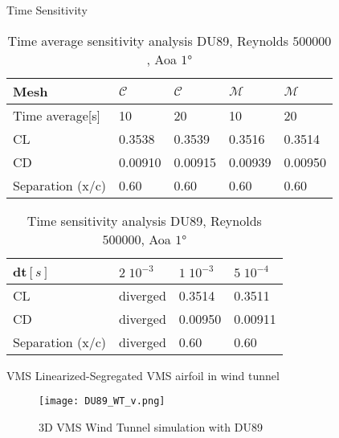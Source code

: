 \begin{frame}{Time Sensitivity}
     \begin{table}[!ht]
          \centering
          
              \begin{tabular}{l|llll}
                  \hline
                  Mesh & $\mathcal{C}$ & $\mathcal{C}$  & $\mathcal{M}$ & $\mathcal{M}$ \\  
                  \hline
                  Time average[s] & 10  & 20 & 10 & 20 \\  
                  CL&0.3538 & 0.3539 & 0.3516 & 0.3514	 \\
                  CD& 0.00910 &0.00915 & 0.00939& 0.00950  \\ 
                  Separation (x/c) & 0.60 & 0.60 & 0.60 & 0.60 \\ 
              \end{tabular}
              
          \caption{Time average sensitivity analysis DU89, Reynolds $\num{500000}$, Aoa $\ang{1}$}
          \label{tab:time-sensitivity-re500000}
     \end{table}

     \begin{table}[!ht]
          \centering
              \begin{tabular}{l|lll}
                  \hline
                  dt$[s]$ & $2\;10^{-3}$  & $1\;10^{-3}$ & $5\;10^{-4}$ \\  \hline
                  CL & diverged & 0.3514  & 0.3511 \\
                  CD & diverged & 0.00950 & 0.00911  \\ 
                  Separation (x/c) & diverged & 0.60 & 0.60 \\ 
              \end{tabular}
              
          \caption{Time sensitivity analysis DU89, Reynolds $\num{500000}$, Aoa $\ang{1}$}
          \label{tab:time-sensitivity-re500000}
          \end{table}
\end{frame}


\begin{frame}{VMS Linearized-Segregated}
VMS airfoil in wind tunnel
     \begin{figure}[h]
          \centering          
              \texttt{[image: DU89\_WT\_v.png]}
              \caption{3D VMS Wind Tunnel simulation with DU89}
          \end{figure} 
\end{frame}